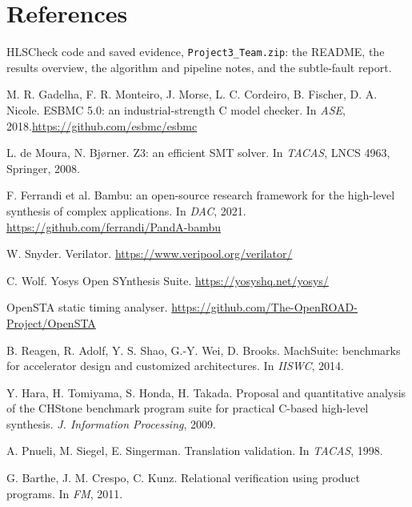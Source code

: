 \documentclass[10pt,a4paper]{article}
\begin{document}
\section*{References}
\begin{enumerate}[label={[\arabic*]},leftmargin=2em]
\item HLSCheck code and saved evidence, \texttt{Project3\_Team.zip}: the README, the results
overview, the algorithm and pipeline notes, and the subtle-fault report.
\item M. R. Gadelha, F. R. Monteiro, J. Morse, L. C. Cordeiro, B. Fischer, D. A. Nicole. ESBMC 5.0: an
industrial-strength C model checker. In \emph{ASE}, 2018.\newline\url{https://github.com/esbmc/esbmc}
\item L. de Moura, N. Bj{\o}rner. Z3: an efficient SMT solver. In \emph{TACAS}, LNCS 4963, Springer, 2008.
\item F. Ferrandi et al. Bambu: an open-source research framework for the high-level synthesis of
complex applications. In \emph{DAC}, 2021. \url{https://github.com/ferrandi/PandA-bambu}
\item W. Snyder. Verilator. \url{https://www.veripool.org/verilator/}
\item C. Wolf. Yosys Open SYnthesis Suite. \url{https://yosyshq.net/yosys/}
\item OpenSTA static timing analyser. \url{https://github.com/The-OpenROAD-Project/OpenSTA}
\item B. Reagen, R. Adolf, Y. S. Shao, G.-Y. Wei, D. Brooks. MachSuite: benchmarks for accelerator
design and customized architectures. In \emph{IISWC}, 2014.
\item Y. Hara, H. Tomiyama, S. Honda, H. Takada. Proposal and quantitative analysis of the CHStone
benchmark program suite for practical C-based high-level synthesis. \emph{J. Information Processing}, 2009.
\item A. Pnueli, M. Siegel, E. Singerman. Translation validation. In \emph{TACAS}, 1998.
\item G. Barthe, J. M. Crespo, C. Kunz. Relational verification using product programs. In \emph{FM}, 2011.
\end{enumerate}
\end{document}
